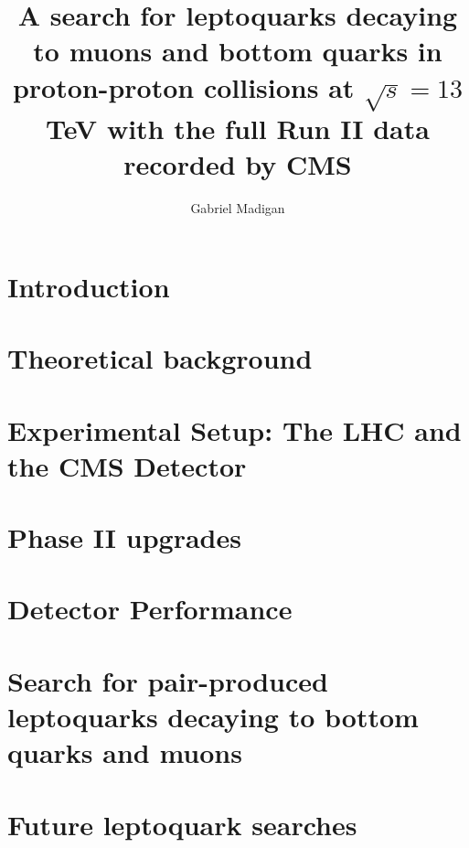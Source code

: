 \documentclass[thesis]{neu}
\title{
A search for leptoquarks decaying to muons and bottom quarks in proton-proton collisions at \texorpdfstring{$\sqrt{s}=13$}{center-of-mass energies = 13} TeV with the full Run II data recorded by CMS 
}
\author{Gabriel Madigan}
\begin{document}
\newpage 

 


\chapter{Introduction} \label{chapter:Introduction}


\chapter{Theoretical background} \label{chapter:Theory}


\chapter{Experimental Setup: The LHC and the CMS Detector} \label{chapter:Experiment}


\chapter{Phase II upgrades} \label{chapter:Phase2Upgrades}


\chapter{Detector Performance} \label{chapter:DetectorPerformance}


\chapter{Search for pair-produced leptoquarks decaying to bottom quarks and muons} \label{chapter:LeptoquarkSearch}
   

\chapter{Future leptoquark searches} \label{chapter:FutureLQSearches}

\end{document}
